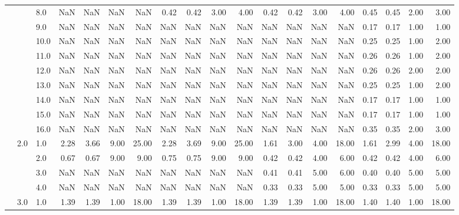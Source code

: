 \begin{tabular}{lllrrrrrrrrrrrrrrrr}
     &     & 8.0  &        NaN &       NaN &   NaN &    NaN &       0.42 &      0.42 &  3.00 &   4.00 &       0.42 &      0.42 &  3.00 &   4.00 &       0.45 &      0.45 & 2.00 &   3.00 \\
     &     & 9.0  &        NaN &       NaN &   NaN &    NaN &        NaN &       NaN &   NaN &    NaN &        NaN &       NaN &   NaN &    NaN &       0.17 &      0.17 & 1.00 &   1.00 \\
     &     & 10.0 &        NaN &       NaN &   NaN &    NaN &        NaN &       NaN &   NaN &    NaN &        NaN &       NaN &   NaN &    NaN &       0.25 &      0.25 & 1.00 &   2.00 \\
     &     & 11.0 &        NaN &       NaN &   NaN &    NaN &        NaN &       NaN &   NaN &    NaN &        NaN &       NaN &   NaN &    NaN &       0.26 &      0.26 & 1.00 &   2.00 \\
     &     & 12.0 &        NaN &       NaN &   NaN &    NaN &        NaN &       NaN &   NaN &    NaN &        NaN &       NaN &   NaN &    NaN &       0.26 &      0.26 & 2.00 &   2.00 \\
     &     & 13.0 &        NaN &       NaN &   NaN &    NaN &        NaN &       NaN &   NaN &    NaN &        NaN &       NaN &   NaN &    NaN &       0.25 &      0.25 & 1.00 &   2.00 \\
     &     & 14.0 &        NaN &       NaN &   NaN &    NaN &        NaN &       NaN &   NaN &    NaN &        NaN &       NaN &   NaN &    NaN &       0.17 &      0.17 & 1.00 &   1.00 \\
     &     & 15.0 &        NaN &       NaN &   NaN &    NaN &        NaN &       NaN &   NaN &    NaN &        NaN &       NaN &   NaN &    NaN &       0.17 &      0.17 & 1.00 &   1.00 \\
     &     & 16.0 &        NaN &       NaN &   NaN &    NaN &        NaN &       NaN &   NaN &    NaN &        NaN &       NaN &   NaN &    NaN &       0.35 &      0.35 & 2.00 &   3.00 \\
     & 2.0 & 1.0  &       2.28 &      3.66 &  9.00 &  25.00 &       2.28 &      3.69 &  9.00 &  25.00 &       1.61 &      3.00 &  4.00 &  18.00 &       1.61 &      2.99 & 4.00 &  18.00 \\
     &     & 2.0  &       0.67 &      0.67 &  9.00 &   9.00 &       0.75 &      0.75 &  9.00 &   9.00 &       0.42 &      0.42 &  4.00 &   6.00 &       0.42 &      0.42 & 4.00 &   6.00 \\
     &     & 3.0  &        NaN &       NaN &   NaN &    NaN &        NaN &       NaN &   NaN &    NaN &       0.41 &      0.41 &  5.00 &   6.00 &       0.40 &      0.40 & 5.00 &   5.00 \\
     &     & 4.0  &        NaN &       NaN &   NaN &    NaN &        NaN &       NaN &   NaN &    NaN &       0.33 &      0.33 &  5.00 &   5.00 &       0.33 &      0.33 & 5.00 &   5.00 \\
     & 3.0 & 1.0  &       1.39 &      1.39 &  1.00 &  18.00 &       1.39 &      1.39 &  1.00 &  18.00 &       1.39 &      1.39 &  1.00 &  18.00 &       1.40 &      1.40 & 1.00 &  18.00 \\
\bottomrule
\end{tabular}
